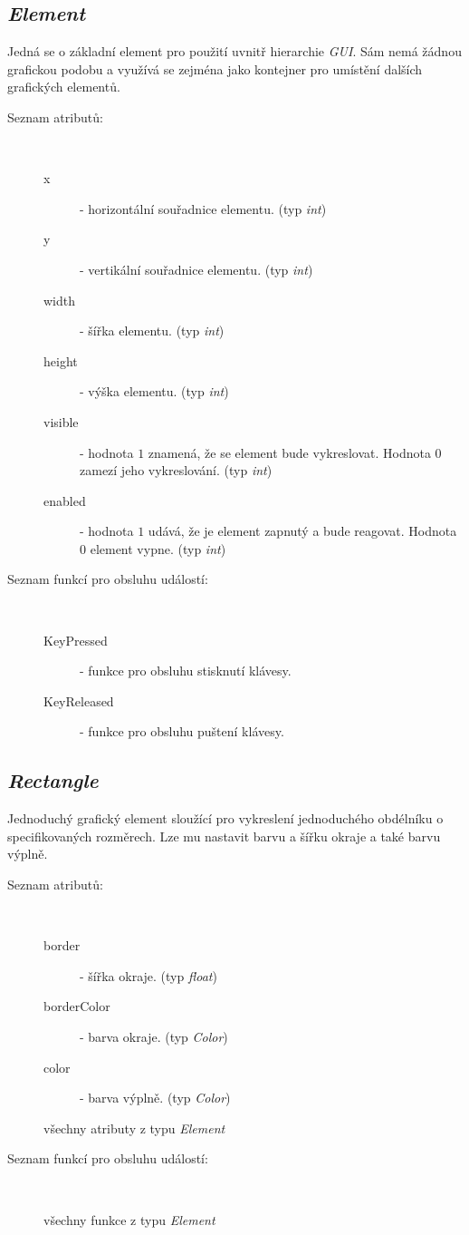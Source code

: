 \documentclass[11pt,twoside,a4paper]{book}
\begin{document}
\subsection{\textit{Element}}
Jedná se o základní element pro použití uvnitř hierarchie \textit{GUI}. Sám nemá žádnou grafickou podobu a využívá se zejména jako kontejner pro umístění dalších grafických elementů.\\
\begin{description}
\item[Seznam atributů:] ~
\begin{description}
\item[x] - horizontální souřadnice elementu. (typ \textit{int})
\item[y] - vertikální souřadnice elementu. (typ \textit{int})
\item[width] - šířka elementu. (typ \textit{int})
\item[height] - výška elementu. (typ \textit{int})
\item[visible] - hodnota $1$ znamená, že se element bude vykreslovat. Hodnota $0$ zamezí jeho vykreslování. (typ \textit{int})
\item[enabled] - hodnota $1$ udává, že je element zapnutý a bude reagovat. Hodnota $0$ element vypne. (typ \textit{int})
\end{description}
\item[Seznam funkcí pro obsluhu událostí:] ~
\begin{description}
\item[KeyPressed] - funkce pro obsluhu stisknutí klávesy.
\item[KeyReleased] - funkce pro obsluhu puštení klávesy.
\end{description}
\end{description}


\subsection{\textit{Rectangle}}
Jednoduchý grafický element sloužící pro vykreslení jednoduchého obdélníku o specifikovaných rozměrech. Lze mu nastavit barvu a šířku okraje a také barvu výplně.\\
\begin{description}
\item[Seznam atributů:] ~
\begin{description}
\item[border] - šířka okraje. (typ \textit{float})
\item[borderColor] - barva okraje. (typ \textit{Color})
\item[color] - barva výplně. (typ \textit{Color})
\item[všechny atributy z typu \textit{Element}]
\end{description}
\item[Seznam funkcí pro obsluhu událostí:] ~
\begin{description}
\item[všechny funkce z typu \textit{Element}]
\end{description}
\end{description}
\end{document}
